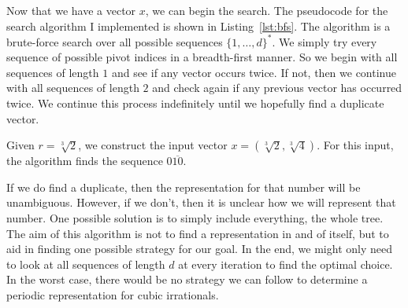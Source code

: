Now that we have a vector $x$, we can begin the search.
The pseudocode for the search algorithm I implemented is shown in Listing~\ref{lst:bfs}.
The algorithm is a brute-force search over all possible sequences $\{1,\dots,d\}^*$.
We simply try every sequence of possible pivot indices in a breadth-first manner.
So we begin with all sequences of length $1$ and see if any vector occurs twice.
If not, then we continue with all sequences of length $2$ and check again if
any previous vector has occurred twice.
We continue this process indefinitely until we hopefully find a duplicate vector.

\begin{example}
  Given $r = \sqrt[3]{2}$, we construct the input vector $x = \left(\sqrt[3]{2}, \sqrt[3]{4}\right)$.
  For this input, the algorithm finds the sequence $0\overline{10}$.

\end{example}



If we do find a duplicate, then the representation for that number will be unambiguous.
However, if we don't, then it is unclear how we will represent that number.
One possible solution is to simply include everything, the whole tree.
The aim of this algorithm is not to find a representation in and of itself,
but to aid in finding one possible strategy for our goal.
In the end, we might only need to look at all sequences of length $d$ at every
iteration to find the optimal choice.
In the worst case, there would be no strategy we can follow to determine a
periodic representation for cubic irrationals.


